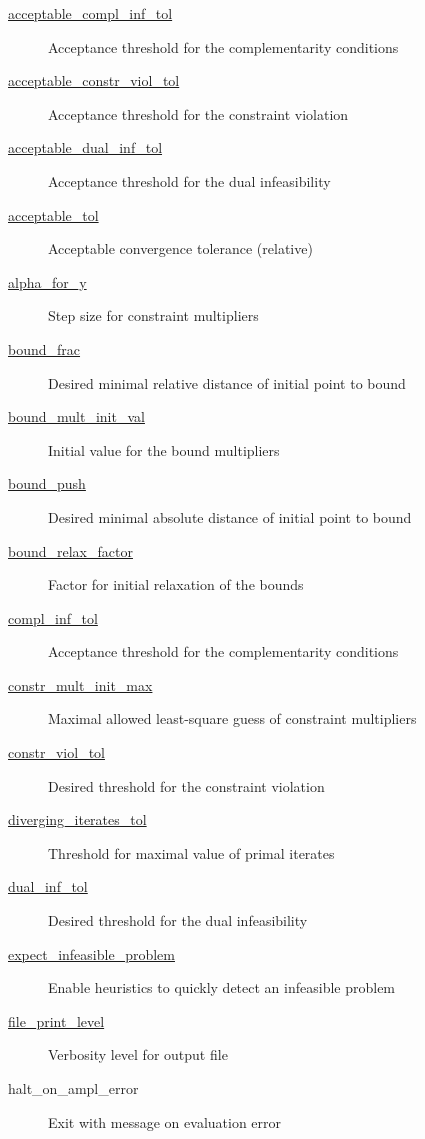 \begin{description}
\item[{\hyperref[sec:acceptable_compl_inf_tol]{acceptable\_compl\_inf\_tol}}] Acceptance threshold for the complementarity conditions
\item[{\hyperref[sec:acceptable_constr_viol_tol]{acceptable\_constr\_viol\_tol}}] Acceptance threshold for the constraint violation
\item[{\hyperref[sec:acceptable_dual_inf_tol]{acceptable\_dual\_inf\_tol}}] Acceptance threshold for the dual infeasibility
\item[{\hyperref[sec:acceptable_tol]{acceptable\_tol}}] Acceptable convergence tolerance (relative)
\item[{\hyperref[sec:alpha_for_y]{alpha\_for\_y}}] Step size for constraint multipliers
\item[{\hyperref[sec:bound_frac]{bound\_frac}}] Desired minimal relative distance of initial point to bound
\item[{\hyperref[sec:bound_mult_init_val]{bound\_mult\_init\_val}}] Initial value for the bound multipliers
\item[{\hyperref[sec:bound_push]{bound\_push}}] Desired minimal absolute distance of initial point to bound
\item[{\hyperref[sec:bound_relax_factor]{bound\_relax\_factor}}] Factor for initial relaxation of the bounds
\item[{\hyperref[sec:compl_inf_tol]{compl\_inf\_tol}}] Acceptance threshold for the complementarity conditions
\item[{\hyperref[sec:constr_mult_init_max]{constr\_mult\_init\_max}}] Maximal allowed least-square guess of constraint multipliers
\item[{\hyperref[sec:constr_viol_tol]{constr\_viol\_tol}}] Desired threshold for the constraint violation
\item[{\hyperref[sec:diverging_iterates_tol]{diverging\_iterates\_tol}}] Threshold for maximal value of primal iterates
\item[{\hyperref[sec:dual_inf_tol]{dual\_inf\_tol}}] Desired threshold for the dual infeasibility
\item[{\hyperref[sec:expect_infeasible_problem]{expect\_infeasible\_problem}}] Enable heuristics to quickly detect an infeasible problem
\item[{\hyperref[sec:file_print_level]{file\_print\_level}}] Verbosity level for output file
\item[halt\_on\_ampl\_error] Exit with message on evaluation error

\end{description}
